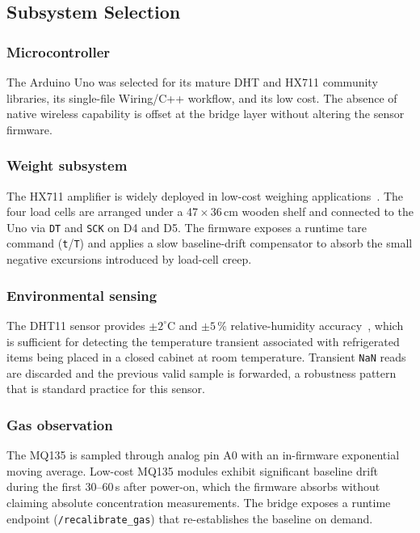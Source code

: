 \subsection{Subsystem Selection}

\subsubsection{Microcontroller}
The Arduino Uno was selected for its mature DHT and HX711 community
libraries, its single-file Wiring/C++ workflow, and its low cost. The
absence of native wireless capability is offset at the bridge layer
without altering the sensor firmware.

\subsubsection{Weight subsystem}
The HX711 amplifier is widely deployed in low-cost weighing
applications~\cite{hx711datasheet}. The four load cells are arranged
under a 47\,$\times$\,36\,cm wooden shelf and connected to the Uno via
\texttt{DT} and \texttt{SCK} on D4 and D5. The firmware exposes a
runtime tare command (\texttt{t}/\texttt{T}) and applies a slow
baseline-drift compensator to absorb the small negative excursions
introduced by load-cell creep.

\subsubsection{Environmental sensing}
The DHT11 sensor provides $\pm 2^\circ\mathrm{C}$ and $\pm 5\,\%$
relative-humidity accuracy~\cite{adafruitdht}, which is sufficient
for detecting the temperature transient associated with
refrigerated items being placed in a closed cabinet at room
temperature. Transient \texttt{NaN} reads are discarded and the
previous valid sample is forwarded, a robustness pattern that is
standard practice for this sensor.

\subsubsection{Gas observation}
The MQ135 is sampled through analog pin A0 with an in-firmware
exponential moving average. Low-cost MQ135 modules exhibit
significant baseline drift during the first 30--60\,s after power-on,
which the firmware absorbs without claiming absolute concentration
measurements. The bridge exposes a runtime endpoint
(\texttt{/recalibrate\_gas}) that re-establishes the baseline on
demand.

